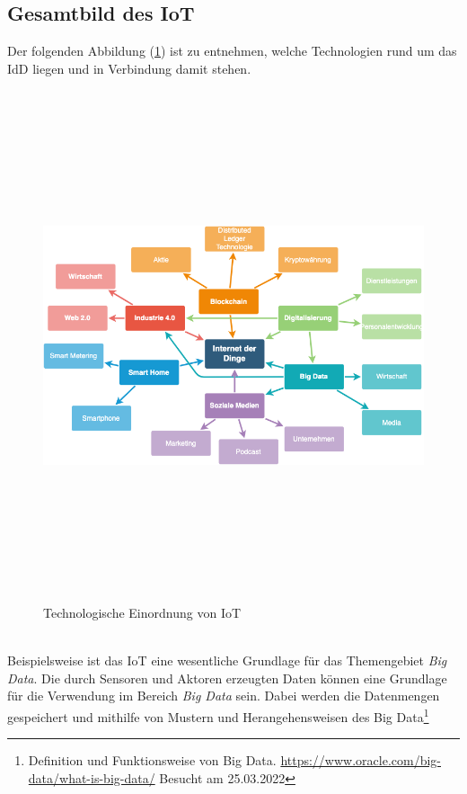     \subsection*{Gesamtbild des \acl{IoT}}
        Der folgenden Abbildung (\ref{pic:mindmap_IoT}) ist zu entnehmen, welche Technologien rund um das \acl{IdD} liegen und in Verbindung damit stehen. 
        \begin{figure}[hbt!]
            \centering
            \includegraphics[width=15cm,height=15cm,keepaspectratio]{images/IoT-Mind_Map.png}
            \caption{Technologische Einordnung von IoT \cite{iotmindmap2018}}
            \label{pic:mindmap_IoT}
        \end{figure}
        \\
        \pagebreak
        \linebreak
        Beispielsweise ist das \acs{IoT} eine wesentliche Grundlage für das Themengebiet \textit{Big Data}. Die durch Sensoren 
        und Aktoren erzeugten Daten 
        können eine Grundlage für die Verwendung im Bereich \textit{Big Data} sein. Dabei werden die Datenmengen gespeichert und mithilfe von Mustern 
        und Herangehensweisen des Big Data\footnote{Definition und Funktionsweise von Big Data. \url{https://www.oracle.com/big-data/what-is-big-data/} Besucht am 25.03.2022} 

